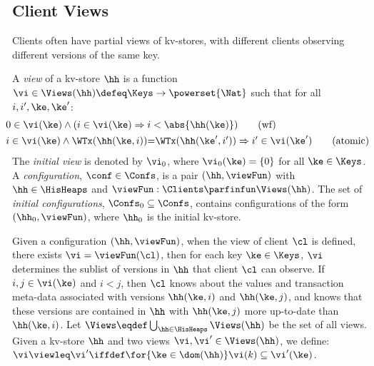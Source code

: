 



\subsection{Client Views}

Clients often have partial views of kv-stores, 
with different clients observing 
different versions of the same key.

\begin{definition}[Views]
\label{def:view}
\label{def:cuts}
\label{def:views}
\label{def:configuration}
A \emph{view} of a kv-store $\hh$ is a function
$\vi \in \Views(\hh) \defeq \Keys \to\powerset{\Nat}$ such that for all $i, i', \ke, \ke'$:
\begin{align}
    & \hspace*{-8pt}
    0 \in \vi(\ke) 
    \wedge (i \in \vi(\ke) \Rightarrow i < \abs{ \hh(\ke) }) 
    \tag{wf}
    \label{eq:view.wf}\\
    & \hspace*{-8pt}
    \begin{array}{@{}l@{}}
	i \in \vi(\ke)  
  	\land \WTx(\hh(\ke, i)) {=} \WTx(\hh(\ke', i'))  
  	\Rightarrow i' \in \vi(\ke')
    \end{array}
	\tag{atomic}
	\label{eq:view.atomic}
\end{align}
The \emph{initial view} is denoted by $\vi_{0}$, where $\vi_{0}(\ke) = \{0\}$ for all $\ke \in \Keys$. 
A \emph{configuration}, $\conf \in \Confs$,  is a pair $ (\hh, \viewFun)$
with $\hh \in \HisHeaps$ and
$\viewFun : \Clients \parfinfun \Views(\hh)$. 
The set of \emph{initial configurations}, $\Confs_0 \subseteq \Confs$, contains configurations of the form $ (\hh_0, \viewFun)$, where $\hh_0$ is the initial kv-store. 
\end{definition}
%


Given a configuration $(\hh, \viewFun)$, when the view of client 
$\cl$ is defined, \ie there exists $\vi = \viewFun(\cl)$, then for each key $\ke \in \Keys$, 
$\vi$ determines the sublist of versions in $\hh$ that client $\cl$ can observe. 
If $i,j \in \vi(\ke)$ and $i < j$, then $\cl$ knows about the values and 
transaction meta-data associated with versions $\hh(\ke, i)$ and  $\hh(\ke, j)$, 
and  knows that these versions are contained in $\hh$ with  $\hh(\ke, j)$ more 
up-to-date than $\hh(\ke, i)$. 
Let $\Views \eqdef \bigcup_{\hh \in \HisHeaps} \Views(\hh)$ be the set of all views. 
Given a kv-store $\hh$ and two views $\vi, \vi' \in \Views(\hh)$, 
we define: $\vi \viewleq \vi' \iffdef \for{\ke \in \dom(\hh)} \vi(k) \subseteq \vi'(\ke)$.

